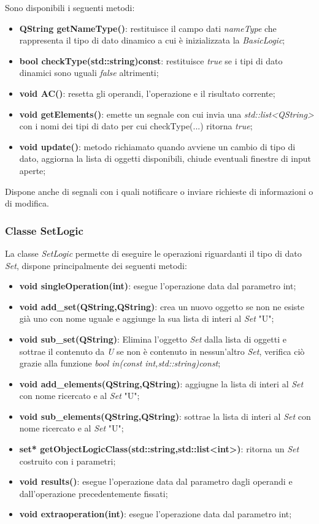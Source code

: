 \documentclass[a4paper,10pt]{article}
\begin{document}
        Sono disponibili i seguenti metodi:
        \begin{itemize}
            \item \textbf{QString getNameType()}: restituisce il campo dati \textit{nameType} che rappresenta il tipo di dato dinamico a cui è inizializzata la \textit{BasicLogic};
            \item \textbf{bool checkType(std::string)const}: restituisce \textit{true} se i tipi di dato dinamici sono uguali \textit{false} altrimenti;
            \item \textbf{void AC()}: resetta gli operandi, l'operazione e il risultato corrente;
            \item \textbf{void getElements()}: emette un segnale con cui invia una \textit{std::list<QString>} con i nomi dei tipi di dato per cui checkType(...) ritorna \textit{true};
            \item \textbf{void update()}: metodo richiamato quando avviene un cambio di tipo di dato, aggiorna la lista di oggetti disponibili, chiude eventuali finestre di input aperte;
        \end{itemize}
        Dispone anche di segnali con i quali notificare o inviare richieste di informazioni o di modifica.

        \subsubsection{Classe SetLogic}
        La classe \textit{SetLogic} permette di eseguire le operazioni riguardanti il tipo di dato \textit{Set}, dispone principalmente dei seguenti metodi:
        \begin{itemize}
            \item \textbf{void singleOperation(int)}: esegue l'operazione data dal parametro int;
            \item \textbf{void add\_set(QString,QString)}: crea un nuovo oggetto se non ne esiste già uno con nome uguale e aggiunge la sua lista di interi al \textit{Set} "U";
            \item \textbf{void sub\_set(QString)}: Elimina l'oggetto \textit{Set} dalla lista di oggetti e sottrae il contenuto da \textit{U} se non è contenuto in nessun'altro \textit{Set}, verifica ciò grazie alla funzione \textit{bool in(const int,std::string)const};
            \item \textbf{void add\_elements(QString,QString)}: aggiugne la lista di interi al \textit{Set} con nome ricercato e al \textit{Set} "U";
            \item \textbf{void sub\_elements(QString,QString)}: sottrae la lista di interi al \textit{Set} con nome ricercato e al \textit{Set} "U";
            \item \textbf{set* getObjectLogicClass(std::string,std::list<int>)}: ritorna un \textit{Set} costruito con i parametri;
            \item \textbf{void results()}: esegue l'operazione data dal parametro dagli operandi e dall'operazione precedentemente fissati;
            \item \textbf{void extraoperation(int)}: esegue l'operazione data dal parametro int;
        \end{itemize}
\end{document}
